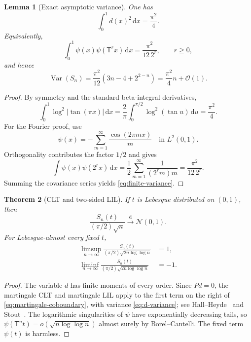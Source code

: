 \documentclass[11pt,oneside]{article}
\newtheorem{theorem}{Theorem}[section]
\newtheorem{lemma}[theorem]{Lemma}
\theoremstyle{definition}
\theoremstyle{remark}
\newcommand{\dd}{\,\mathrm d}
\newcommand{\bigO}{\mathcal O}
\newcommand{\T}{\mathsf T}
\newcommand{\Var}{\operatorname{Var}}
\newcommand{\dist}{\mathop{\longrightarrow}\limits^{\mathrm d}}
\begin{document}
\begin{lemma}[Exact asymptotic variance]
\label{lem:variance}
One has
\begin{equation}
 \int_0^1d(x)^2\dd x=\frac{\pi^2}{4}.
 \label{eq:d-variance}
\end{equation}
Equivalently,
\begin{equation}
 \int_0^1\psi(x)\psi(\T^rx)\dd x
 =\frac{\pi^2}{12\,2^r},
 \qquad r\ge0,
 \label{eq:covariance}
\end{equation}
and hence
\begin{equation}
 \Var(S_n)
 =\frac{\pi^2}{12}\left(3n-4+2^{2-n}\right)
 =\frac{\pi^2}{4}n+\bigO(1).
 \label{eq:finite-variance}
\end{equation}
\end{lemma}

\begin{proof}
By symmetry and the standard beta-integral derivatives,
\[
 \int_0^1\log^2|\tan(\pi x)|\dd x
 =\frac2\pi\int_0^{\pi/2}\log^2(\tan u)\dd u
 =\frac{\pi^2}{4}.
\]
For the Fourier proof, use
\begin{equation}
 \psi(x)=-\sum_{m=1}^{\infty}\frac{\cos(2\pi mx)}m
 \quad\text{in }L^2(0,1).
 \label{eq:psi-Fourier}
\end{equation}
Orthogonality contributes the factor $1/2$ and gives
\[
 \int\psi(x)\psi(2^rx)\dd x
 =\frac12\sum_{m=1}^{\infty}\frac1{(2^rm)m}
 =\frac{\pi^2}{12\,2^r}.
\]
Summing the covariance series yields \eqref{eq:finite-variance}.
\end{proof}

\begin{theorem}[CLT and two-sided LIL]
\label{thm:CLT-LIL}
If $t$ is Lebesgue distributed on $(0,1)$, then
\begin{equation}
 \frac{S_n(t)}{(\pi/2)\sqrt n}\dist\mathcal N(0,1).
 \label{eq:CLT}
\end{equation}
For Lebesgue-almost every fixed $t$,
\begin{align}
 \limsup_{n\to\infty}
 \frac{S_n(t)}{(\pi/2)\sqrt{2n\log\log n}}&=1,
 \label{eq:LIL-plus}\\
 \liminf_{n\to\infty}
 \frac{S_n(t)}{(\pi/2)\sqrt{2n\log\log n}}&=-1.
 \label{eq:LIL-minus}
\end{align}
\end{theorem}

\begin{proof}
The variable $d$ has finite moments of every order.  Since $Pd=0$, the
martingale CLT and martingale LIL apply to the first term on the right of
\eqref{eq:martingale-coboundary}, with variance \eqref{eq:d-variance}; see
Hall--Heyde~\cite{hallheyde} and Stout~\cite{stout}.  The logarithmic
singularities of $\psi$ have exponentially decreasing tails, so
$\psi(\T^nt)=o(\sqrt{n\log\log n})$ almost surely by Borel--Cantelli.  The
fixed term $\psi(t)$ is harmless.
\end{proof}
\end{document}
